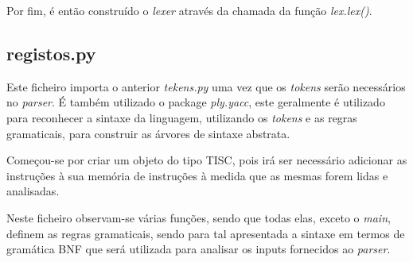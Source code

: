\documentclass[titlepage,11pt,svgnames]{article}   %
\begin{document}
Por fim, é então construído o \textit{lexer} através da chamada da função \textit{lex.lex()}.

\subsection{registos.py}

Este ficheiro importa o anterior \textit{tekens.py} uma vez que os \textit{tokens} serão necessários no \textit{parser}. É também utilizado o package \textit{ply.yacc}, este geralmente é utilizado para reconhecer a sintaxe da linguagem, utilizando os \textit{tokens} e as regras gramaticais, para construir as árvores de sintaxe abstrata.

Começou-se por criar um objeto do tipo TISC, pois irá ser necessário adicionar as instruções à sua memória de instruções à medida que as mesmas forem lidas e analisadas.

Neste ficheiro observam-se várias funções, sendo que todas elas, exceto o \textit{main}, definem as regras gramaticais, sendo para tal apresentada a sintaxe em termos de gramática BNF que será utilizada para analisar os inputs fornecidos ao \textit{parser}.
\end{document}
